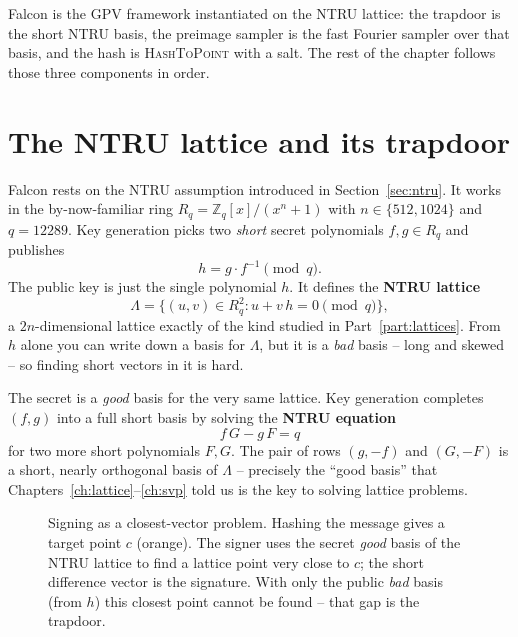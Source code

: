 Falcon is the GPV framework instantiated on the NTRU lattice: the trapdoor is the short NTRU basis, the preimage sampler is the fast Fourier sampler over that basis, and the hash is \textsc{HashToPoint} with a salt. The rest of the chapter follows those three components in order.

\section{The NTRU lattice and its trapdoor}

Falcon rests on the NTRU assumption introduced in Section~\ref{sec:ntru}. It works in the by-now-familiar ring $R_q = \mathbb{Z}_q[x]/(x^n+1)$ with $n \in \{512, 1024\}$ and $q = 12289$. Key generation picks two \emph{short} secret polynomials $f, g \in R_q$ and publishes
\[
h = g \cdot f^{-1} \pmod q.
\]
The public key is just the single polynomial $h$. It defines the \textbf{NTRU lattice}
\[
\Lambda = \{ (u, v) \in R_q^2 : u + v\,h = 0 \pmod q \},
\]
a $2n$-dimensional lattice exactly of the kind studied in Part~\ref{part:lattices}. From $h$ alone you can write down a basis for $\Lambda$, but it is a \emph{bad} basis -- long and skewed -- so finding short vectors in it is hard.

The secret is a \emph{good} basis for the very same lattice. Key generation completes $(f,g)$ into a full short basis by solving the \textbf{NTRU equation}
\[
f\,G - g\,F = q
\]
for two more short polynomials $F, G$. The pair of rows $(g, -f)$ and $(G, -F)$ is a short, nearly orthogonal basis of $\Lambda$ -- precisely the ``good basis'' that Chapters~\ref{ch:lattice}--\ref{ch:svp} told us is the key to solving lattice problems.

\begin{figure}[H]
\centering
{}
\caption{Signing as a closest-vector problem. Hashing the message gives a target point $c$ (orange). The signer uses the secret \emph{good} basis of the NTRU lattice to find a lattice point very close to $c$; the short difference vector is the signature. With only the public \emph{bad} basis (from $h$) this closest point cannot be found -- that gap is the trapdoor.}
\label{fig:falcon-cvp}
\end{figure}


